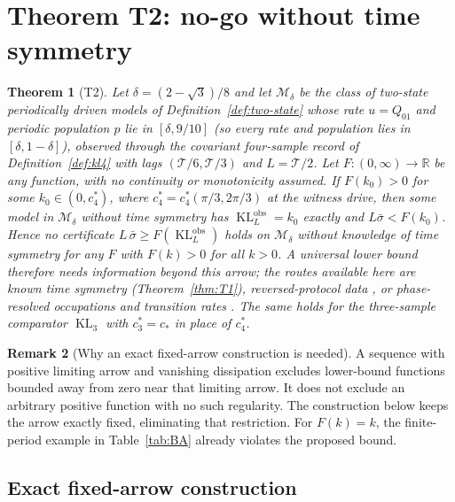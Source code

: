 \documentclass[10pt]{article}
\newtheorem{theorem}{Theorem}[section]
\theoremstyle{definition}
\newtheorem{remark}[theorem]{Remark}
\DeclareMathOperator{\KL}{KL}
\newcommand{\per}{\mathcal T}
\newcommand{\sbar}{\bar\sigma}
\newcommand{\Rr}{\mathbb R}
\begin{document}
\section{Theorem T2: no-go without time symmetry}
\label{sec:T2}

\begin{theorem}[T2]
\label{thm:T2}
Let $\delta=(2-\sqrt3)/8$ and let $\mathcal M_\delta$ be the class of
two-state periodically driven models of Definition~\ref{def:two-state}
whose rate $u=Q_{01}$ and periodic population $p$ lie in $[\delta,9/10]$
(so every rate and population lies in $[\delta,1-\delta]$), observed
through the covariant four-sample record of Definition~\ref{def:kl4} with
lags $(\per/6,\per/3)$ and $L=\per/2$.  Let $F\colon(0,\infty)\to\Rr$ be
any function, with no continuity or monotonicity assumed.  If $F(k_0)>0$
for some $k_0\in(0,c_4^*)$, where $c_4^*=c_4^*(\pi/3,2\pi/3)$ at the
witness drive, then some model in $\mathcal M_\delta$ without time
symmetry has $\KL^{\mathrm{obs}}_L=k_0$ exactly and $L\sbar<F(k_0)$.
Hence no certificate $L\,\sbar\geq F(\KL^{\mathrm{obs}}_L)$ holds on
$\mathcal M_\delta$ without knowledge of time symmetry for any $F$ with
$F(k)>0$ for all $k>0$.  A universal lower bound therefore needs
information beyond this arrow; the routes available here are known time
symmetry (Theorem~\ref{thm:T1}), reversed-protocol data
\cite{HFB2024}, or phase-resolved occupations and transition rates
\cite[Eq.~19]{Maier2024}. The
same holds for the three-sample comparator $\KL_3$ with $c_3^*=c_*$ in
place of $c_4^*$.
\end{theorem}

\begin{remark}[Why an exact fixed-arrow construction is needed]
\label{rem:F}
A sequence with positive limiting arrow and vanishing dissipation excludes
lower-bound functions bounded away from zero near that limiting arrow.
It does not exclude an arbitrary positive function with no such regularity.
The construction below keeps the arrow exactly fixed, eliminating that
restriction. For $F(k)=k$, the finite-period example in
Table~\ref{tab:BA} already violates the proposed bound.
\end{remark}

\subsection{Exact fixed-arrow construction}
\label{sec:T2fixed}
\end{document}

